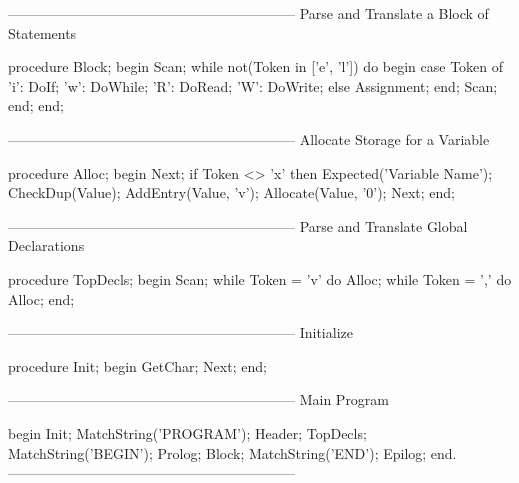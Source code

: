 \documentclass[float=false, crop=false]{standalone}
\begin{document}
\begin{code}
{--------------------------------------------------------------}
{ Parse and Translate a Block of Statements }

procedure Block;
begin
   Scan;
   while not(Token in ['e', 'l']) do begin
      case Token of
       'i': DoIf;
       'w': DoWhile;
       'R': DoRead;
       'W': DoWrite;
      else Assignment;
      end;
      Scan;
   end;
end;


{--------------------------------------------------------------}
{ Allocate Storage for a Variable }

procedure Alloc;
begin
   Next;
   if Token <> 'x' then Expected('Variable Name');
   CheckDup(Value);
   AddEntry(Value, 'v');
   Allocate(Value, '0');
   Next;
end;


{--------------------------------------------------------------}
{ Parse and Translate Global Declarations }

procedure TopDecls;
begin
   Scan;
   while Token = 'v' do
      Alloc;
      while Token = ',' do
         Alloc;
end;


{--------------------------------------------------------------}
{ Initialize }

procedure Init;
begin
   GetChar;
   Next;
end;


{--------------------------------------------------------------}
{ Main Program }

begin
   Init;
   MatchString('PROGRAM');
   Header;
   TopDecls;
   MatchString('BEGIN');
   Prolog;
   Block;
   MatchString('END');
   Epilog;
end.
{--------------------------------------------------------------}
\end{code}
\end{document}
